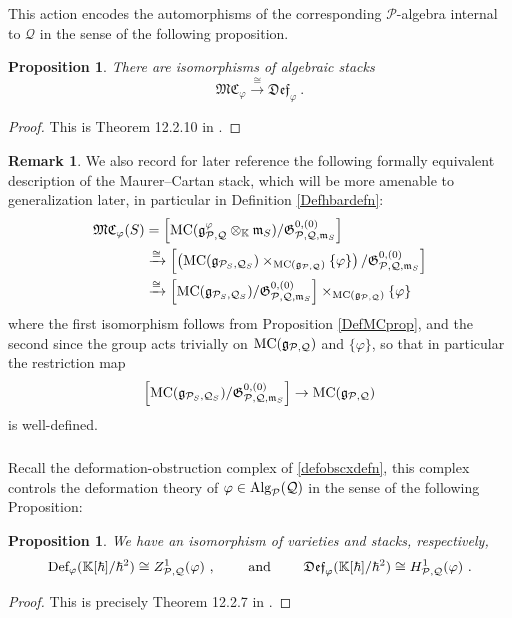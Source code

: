 \documentclass[11pt]{amsart}
\numberwithin{equation}{section}
\newtheorem{prop}[theo]{Proposition}
\theoremstyle{definition}
\newtheorem{rmk}[theo]{Remark}
\newcommand{\bb}{\mathbb}
\newcommand{\mc}{\mathcal}
\newcommand{\mf}{\mathfrak}
\newcommand{\Def}{{\textup{Def}}}
\newcommand{\fDef}{{\mathfrak{Def}}}
\newcommand{\ik}{{\bb K}}
\newcommand{\Alg}{{\textup{Alg}}}
\newcommand{\MC}{{{\textup{MC}}}}
\newcommand{\fMC}{{{\mathfrak{MC}}}}
\newcommand{\0}{{\textbf{0}}}
\newcommand{\g}{{\mf{g}}}
\def\PP{{\mc P}}
\def\QQ{{\mc Q}}
\def \mf{\mathfrak}
\begin{document}
This action encodes the automorphisms of the corresponding $\mc P$-algebra internal to $\mc Q$ in the sense of the following proposition.

\begin{prop}\label{fDefMCprop} 
There are isomorphisms of algebraic stacks
\[ 
\fMC_\varphi \xrightarrow{\cong} \fDef_\varphi \ . 
\]
\end{prop}
\begin{proof} This is Theorem 12.2.10 in \cite{LV}.
\end{proof}

\begin{rmk}\label{MCdefgensubsec}
 We also record for later reference the following formally equivalent description of the Maurer--Cartan stack, which will be more amenable to generalization later, in particular in Definition \ref{Defhbardefn}:
\begin{align} 
\notag	\fMC_\varphi(S) & =\left[ \MC( \g^\varphi_{\mc P, \mc Q}\otimes_{\bb K} \mf m_S)/\mf G_{\mc P,\mc Q,\mf m_S}^{0,(0)}\right]   \\
	\notag & \xrightarrow{\cong} \left[  \left(\MC(\g_{\mc P_S,\mc Q_S}) \times_{\MC(\g_{\mc P, \mc Q})} \{\varphi\}\right) /\mf G_{\mc P,\mc Q,\mf m_S}^{0,(0)}\right]  \\
	& \xrightarrow{\cong} \left[\MC(\g_{\mc P_S,\mc Q_S}) /\mf G_{\mc P,\mc Q,\mf m_S}^{0,(0)}\right] \times_{\MC(\g_{\mc P, \mc Q})} \{\varphi\} \label{MCconceqn}
\end{align}
where the first isomorphism follows from Proposition \ref{DefMCprop}, and the second since the group acts trivially on $\MC(\g_{\mc P, \mc Q})$ and $\{\varphi\}$, so that in particular the restriction map 
\[\left[\MC(\g_{\mc P_S,\mc Q_S}) /\mf G_{\mc P,\mc Q,\mf m_S}^{0,(0)}\right] \to \MC(\g_{\mc P, \mc Q})\]
 is well-defined.
\end{rmk}

\subsubsection{}

Recall the deformation-obstruction complex of \ref{defobscxdefn}, this complex controls the deformation theory of $\varphi\in \Alg_{\PP}(\QQ)$ in the sense of the following Proposition:

\begin{prop}\label{tgtOpMapprop} 
We have an isomorphism of varieties and stacks, respectively,
\[
\Def_\varphi(\ik[\hbar]/\hbar^2) \cong Z^1_{\PP,\QQ}(\varphi)~, \qquad \text{ and } \qquad \fDef_\varphi(\ik[\hbar]/\hbar^2) \cong H^1_{\PP,\QQ}(\varphi)~.
\]
\end{prop}
\begin{proof} 
This is precisely Theorem 12.2.7 in \cite{LV}. 
\end{proof}
\end{document}
